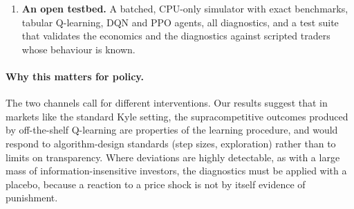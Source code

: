 \begin{enumerate}
  nothing ($\Delta=\OpaqueDeltaInt$), while counterfactual updating, a change
  to the learning rule alone, restores competition ($\Delta=\CfResidDeltaInt$).
  In the \citet{dou2025} regime, where deviations are glaring, our
  separate-table learners match the independent replication's collusion
  level ($\DouStratDeltaInt$) and still do not punish. With a shared Q-table, a \emph{myopic} learner
  reproduces both the high collusion index ($\SharedDouMyopicDeltaInt$) and the
  threshold-shaped response to noise shocks that has been read as a price
  trigger, so that signature does not identify collusion without a placebo.
\item \textbf{An open testbed.} A batched, CPU-only simulator with exact
  benchmarks, tabular Q-learning, DQN and PPO agents, all diagnostics, and a
  test suite that validates the economics and the diagnostics against
  scripted traders whose behaviour is known.
\end{enumerate}

\paragraph{Why this matters for policy.} The two channels call for different
interventions. Our results suggest that in markets like the standard Kyle
setting, the supracompetitive outcomes produced by off-the-shelf Q-learning are
properties of the learning procedure, and would respond to algorithm-design
standards (step sizes, exploration) rather than to limits on transparency.
Where deviations are highly detectable, as with a large mass of
information-insensitive investors, the diagnostics must be applied with a
placebo, because a reaction to a price shock is not by itself evidence of
punishment.
